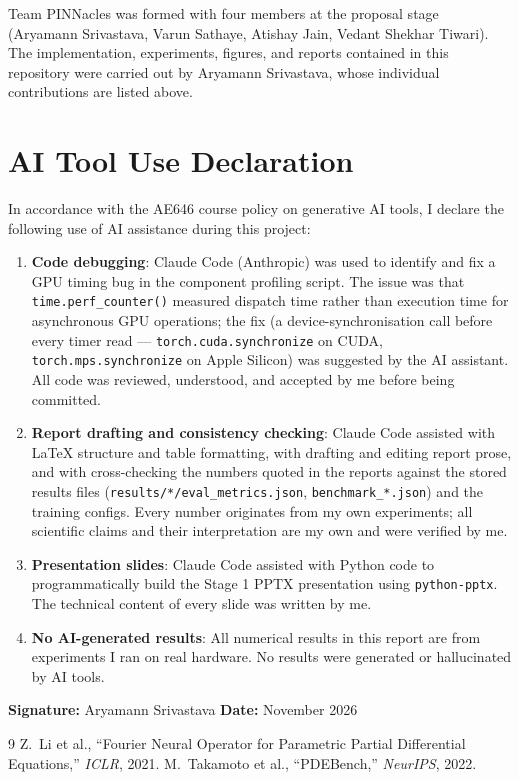 \documentclass[11pt,a4paper]{article}
\begin{document}
Team PINNacles was formed with four members at the proposal stage (Aryamann Srivastava, Varun Sathaye, Atishay Jain, Vedant Shekhar Tiwari). The implementation, experiments, figures, and reports contained in this repository were carried out by Aryamann Srivastava, whose individual contributions are listed above.

\bigskip
\section*{AI Tool Use Declaration}

In accordance with the AE646 course policy on generative AI tools, I declare the following use of AI assistance during this project:

\begin{enumerate}
  \item \textbf{Code debugging}: Claude Code (Anthropic) was used to identify and fix a GPU timing bug in the component profiling script. The issue was that \texttt{time.perf\_counter()} measured dispatch time rather than execution time for asynchronous GPU operations; the fix (a device-synchronisation call before every timer read --- \texttt{torch.cuda.synchronize} on CUDA, \texttt{torch.mps.synchronize} on Apple Silicon) was suggested by the AI assistant. All code was reviewed, understood, and accepted by me before being committed.

  \item \textbf{Report drafting and consistency checking}: Claude Code assisted with LaTeX structure and table formatting, with drafting and editing report prose, and with cross-checking the numbers quoted in the reports against the stored results files (\texttt{results/*/eval\_metrics.json}, \texttt{benchmark\_*.json}) and the training configs. Every number originates from my own experiments; all scientific claims and their interpretation are my own and were verified by me.

  \item \textbf{Presentation slides}: Claude Code assisted with Python code to programmatically build the Stage 1 PPTX presentation using \texttt{python-pptx}. The technical content of every slide was written by me.

  \item \textbf{No AI-generated results}: All numerical results in this report are from experiments I ran on real hardware. No results were generated or hallucinated by AI tools.
\end{enumerate}

\bigskip
\noindent
\textbf{Signature:} Aryamann Srivastava \hfill \textbf{Date:} November 2026

\bigskip
\begin{thebibliography}{9}
  Z.\ Li et al., ``Fourier Neural Operator for Parametric Partial Differential Equations,'' \textit{ICLR}, 2021.
  M.\ Takamoto et al., ``PDEBench,'' \textit{NeurIPS}, 2022.
\end{thebibliography}
\end{document}
